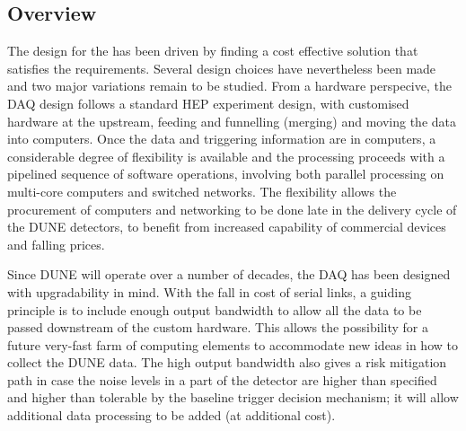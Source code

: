 \subsection{Overview}
\label{sec:fd-daq-overview}



The design for the  has been driven by finding a cost
effective solution that satisfies the requirements. Several design
choices have nevertheless been made and two major variations remain to
be studied. 
From a hardware perspecive, the DAQ design follows a standard HEP
experiment design, with customised hardware at the upstream, feeding
and funnelling (merging) and moving the data into computers. 
Once the data and triggering information are in computers, a
considerable degree of flexibility is available and the processing
proceeds with a pipelined sequence of software operations, involving
both parallel processing on multi-core computers and switched
networks. The flexibility allows the procurement of computers and
networking to be done late in the delivery cycle of the DUNE
detectors, to benefit from increased capability of commercial devices
and falling prices.

Since DUNE will operate over a number of decades, the DAQ has been
designed with upgradability in mind.  With the fall in cost of serial
links, a guiding principle is to include enough output bandwidth to
allow all the data to be passed downstream of the custom hardware.
This allows the possibility for a future very-fast farm of computing
elements to accommodate new ideas in how to collect the DUNE data.  The
high output bandwidth also gives a risk mitigation path in case the
noise levels in a part of the detector are higher than specified and
higher than tolerable by the baseline trigger decision mechanism; it
will allow additional data processing to be added (at additional cost).

